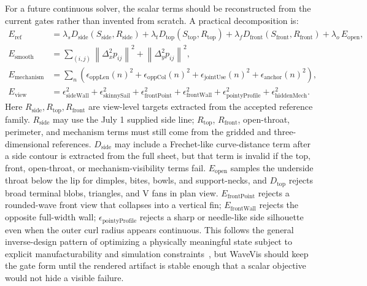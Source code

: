 \documentclass[12pt,letterpaper]{article}
\newcommand{\norm}[1]{\left\lVert #1 \right\rVert}
\begin{document}
For a future continuous solver, the scalar terms should be reconstructed from the current gates rather than invented from scratch. A practical decomposition is:
\[
\begin{aligned}
E_{\mathrm{ref}} &= \lambda_s D_{\mathrm{side}}\!\left(S_{\mathrm{side}},R_{\mathrm{side}}\right)
  + \lambda_t D_{\mathrm{top}}\!\left(S_{\mathrm{top}},R_{\mathrm{top}}\right)
  + \lambda_f D_{\mathrm{front}}\!\left(S_{\mathrm{front}},R_{\mathrm{front}}\right)
  + \lambda_o\,E_{\mathrm{open}},\\
E_{\mathrm{smooth}} &= \sum_{(i,j)} \norm{\Delta^2_x p_{ij}}^2+\norm{\Delta^2_y p_{ij}}^2,\\
E_{\mathrm{mechanism}} &= \sum_n\left(
  \epsilon_{\mathrm{oppLen}}(n)^2+
  \epsilon_{\mathrm{oppCol}}(n)^2+
  \epsilon_{\mathrm{jointUse}}(n)^2+
  \epsilon_{\mathrm{anchor}}(n)^2
\right),\\
E_{\mathrm{view}} &= \epsilon_{\mathrm{sideWall}}^2+\epsilon_{\mathrm{skinnySail}}^2+\epsilon_{\mathrm{frontPoint}}^2+\epsilon_{\mathrm{frontWall}}^2+\epsilon_{\mathrm{pointyProfile}}^2+\epsilon_{\mathrm{hiddenMech}}^2.
\end{aligned}
\]
Here \(R_{\mathrm{side}},R_{\mathrm{top}},R_{\mathrm{front}}\) are view-level targets extracted from the accepted reference family. \(R_{\mathrm{side}}\) may use the July 1 supplied side line; \(R_{\mathrm{top}}\), \(R_{\mathrm{front}}\), open-throat, perimeter, and mechanism terms must still come from the gridded and three-dimensional references. \(D_{\mathrm{side}}\) may include a Frechet-like curve-distance term after a side contour is extracted from the full sheet, but that term is invalid if the top, front, open-throat, or mechanism-visibility terms fail. \(E_{\mathrm{open}}\) samples the underside throat below the lip for dimples, bites, bowls, and support-necks, and \(D_{\mathrm{top}}\) rejects broad terminal blobs, triangles, and V fans in plan view. \(E_{\mathrm{frontPoint}}\) rejects a rounded-wave front view that collapses into a vertical fin; \(E_{\mathrm{frontWall}}\) rejects the opposite full-width wall; \(\epsilon_{\mathrm{pointyProfile}}\) rejects a sharp or needle-like side silhouette even when the outer curl radius appears continuous. This follows the general inverse-design pattern of optimizing a physically meaningful state subject to explicit manufacturability and simulation constraints~\cite{skouras_designing_inflatable_2014,konakovic_auxetic_2016,panetta_surface_inflatables_2021,du_diffpd_2022}, but WaveVis should keep the gate form until the rendered artifact is stable enough that a scalar objective would not hide a visible failure.
\end{document}
